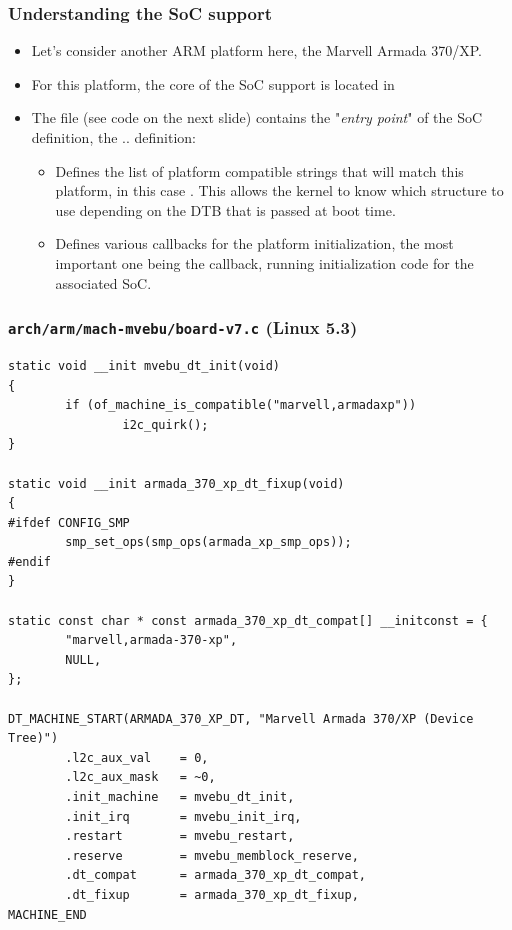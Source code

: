 \begin{frame}
  \frametitle{Understanding the SoC support}
  \begin{itemize}
  \item Let's consider another ARM platform here, the Marvell Armada
    370/XP.
  \item For this platform, the core of the SoC support is located in
  \item The  file (see code on the next slide)
    contains the "{\em entry point}" of the SoC definition, the
     ..  definition:
    \begin{itemize}
    \item Defines the list of platform compatible strings that will
      match this platform, in this case
      . This allows the kernel to know
      which  structure to use depending on the DTB
      that is passed at boot time.
    \item Defines various callbacks for the platform initialization,
      the most important one being the  callback,
      running initialization code for the associated SoC.
    \end{itemize}
  \end{itemize}
\end{frame}

\begin{frame}[fragile]
  \frametitle{{\tt arch/arm/mach-mvebu/board-v7.c} (Linux 5.3)}
  \begin{block}{}
    \begin{verbatim}
static void __init mvebu_dt_init(void)
{
        if (of_machine_is_compatible("marvell,armadaxp"))
                i2c_quirk();
}

static void __init armada_370_xp_dt_fixup(void)
{
#ifdef CONFIG_SMP
        smp_set_ops(smp_ops(armada_xp_smp_ops));
#endif
}

static const char * const armada_370_xp_dt_compat[] __initconst = {
        "marvell,armada-370-xp",
        NULL,
};

DT_MACHINE_START(ARMADA_370_XP_DT, "Marvell Armada 370/XP (Device Tree)")
        .l2c_aux_val    = 0,
        .l2c_aux_mask   = ~0,
        .init_machine   = mvebu_dt_init,
        .init_irq       = mvebu_init_irq,
        .restart        = mvebu_restart,
        .reserve        = mvebu_memblock_reserve,
        .dt_compat      = armada_370_xp_dt_compat,
        .dt_fixup       = armada_370_xp_dt_fixup,
MACHINE_END
  \end{verbatim}
 \end{block}
\end{frame}

